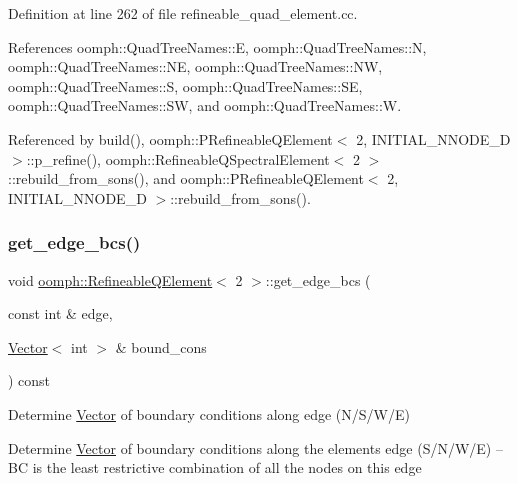 Definition at line 262 of file refineable\+\_\+quad\+\_\+element.\+cc.



References oomph\+::\+Quad\+Tree\+Names\+::E, oomph\+::\+Quad\+Tree\+Names\+::N, oomph\+::\+Quad\+Tree\+Names\+::\+NE, oomph\+::\+Quad\+Tree\+Names\+::\+NW, oomph\+::\+Quad\+Tree\+Names\+::S, oomph\+::\+Quad\+Tree\+Names\+::\+SE, oomph\+::\+Quad\+Tree\+Names\+::\+SW, and oomph\+::\+Quad\+Tree\+Names\+::W.



Referenced by build(), oomph\+::\+P\+Refineable\+Q\+Element$<$ 2, I\+N\+I\+T\+I\+A\+L\+\_\+\+N\+N\+O\+D\+E\+\_\+D $>$\+::p\+\_\+refine(), oomph\+::\+Refineable\+Q\+Spectral\+Element$<$ 2 $>$\+::rebuild\+\_\+from\+\_\+sons(), and oomph\+::\+P\+Refineable\+Q\+Element$<$ 2, I\+N\+I\+T\+I\+A\+L\+\_\+\+N\+N\+O\+D\+E\+\_\+D $>$\+::rebuild\+\_\+from\+\_\+sons().

\mbox{\label{classoomph_1_1RefineableQElement_3_012_01_4_a00bdd114af9683a6097acdf4d11912ae}} 
\subsubsection{\texorpdfstring{get\+\_\+edge\+\_\+bcs()}{get\_edge\_bcs()}}
{\footnotesize\ttfamily void \hyperlink{classoomph_1_1RefineableQElement}{oomph\+::\+Refineable\+Q\+Element}$<$ 2 $>$\+::get\+\_\+edge\+\_\+bcs (\begin{DoxyParamCaption}\item[{const int \&}]{edge,  }\item[{\hyperlink{classoomph_1_1Vector}{Vector}$<$ int $>$ \&}]{bound\+\_\+cons }\end{DoxyParamCaption}) const\hspace{0.3cm}{\ttfamily [protected]}}



Determine \hyperlink{classoomph_1_1Vector}{Vector} of boundary conditions along edge (N/\+S/\+W/E) 

Determine \hyperlink{classoomph_1_1Vector}{Vector} of boundary conditions along the element\textquotesingle{}s edge (S/\+N/\+W/E) -- BC is the least restrictive combination of all the nodes on this edge


